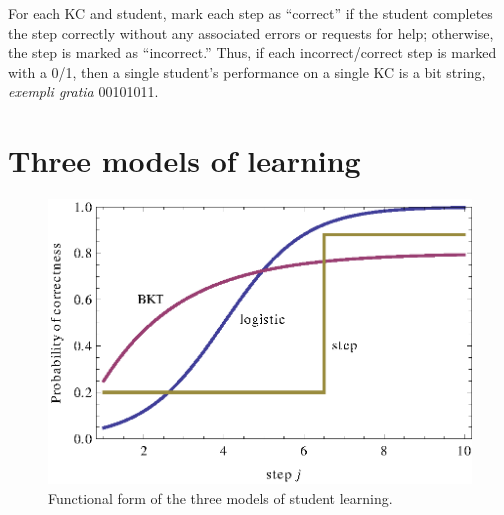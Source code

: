 \documentclass{acmlarge-edm}
\begin{document}
%
%

For each KC and student, mark each step as ``correct'' if
the student completes the step correctly without any associated errors or 
requests for help; otherwise, the step is marked as ``incorrect.''
\label{steps} 
%
Thus, if each incorrect/correct step is marked with a 0/1, then
a single student's performance on a single KC is a bit string,
{\em exempli gratia} 00101011.

\section{Three models of learning}

\begin{figure}
  \centering \includegraphics{three-models.eps}
  \caption{Functional form of the three models of student learning.}
    \label{three-models}
\end{figure}
\end{document}
